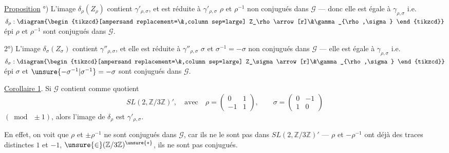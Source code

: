 

\uline{Proposition} °) L'image $\delta_\rho(Z_\rho)$ contient
$\gamma'_{\rho,\sigma}$, et est
réduite à $\gamma'_{\rho,\sigma}$ 
$\rho$ et $\rho^{-1}$ non conjugués dans $\mathcal{G}$ ---
donc elle est égale à $\gamma_{\rho,\sigma}$
i.e.
$\delta_\rho:\diagram{\begin{tikzcd}[ampersand replacement=\&,column sep=large]
Z_\rho\arrow[r]\&\gamma_{\rho,\sigma}
\end{tikzcd}}$
épi  $\rho$ et $\rho^{-1}$ sont conjugués dans $\mathcal{G}$.

2°) L'image $\delta_\sigma(Z_\sigma)$ contient
$\gamma''_{\rho,\sigma}$, et elle est réduite à
$\gamma''_{\rho,\sigma}$  $\sigma$ et
$\sigma^{-1}=-\sigma$ non conjugués dans $\mathcal{G}$ ---
 elle est égale à $\gamma_{\rho,\sigma}$ i.e.
$\delta_\sigma:\diagram{\begin{tikzcd}[ampersand replacement=\&,column sep=large]
Z_\sigma\arrow[r]\&\gamma_{\rho,\sigma}
\end{tikzcd}}$
épi  $\sigma$ et
$\unsure{-\sigma^{-1}|\sigma^{-1}}=-\sigma$ sont conjugués dans $\mathcal{G}$.

\uline{Corollaire 1}. Si $\mathcal{G}$ contient comme quotient
\[
SL(2,\mathbb{Z}/3\mathbb{Z})',\quad\text{avec}\quad
\rho=\begin{pmatrix}0&1\\-1&1\end{pmatrix},\qquad
\sigma=\begin{pmatrix}0&-1\\1&0\end{pmatrix}
\]
$(\bmod\ \pm1)$, alors l'image de $\delta_\rho$ est
$\gamma'_{\rho,\sigma}$.

En effet, on voit que $\rho$ et $\pm\rho^{-1}$ ne sont
conjugués dans $\mathcal{G}$, car ils ne le sont
pas dans $SL(2,\mathbb{Z}/3\mathbb{Z})'$ ---
$\rho$ et $-\rho^{-1}$ ont déjà des traces distinctes
$1$ et $-1$, $\unsure{\in}(\mathbb{Z}/3\mathbb{Z})^{\unsure{*}}$,
ils ne sont pas conjugués.

